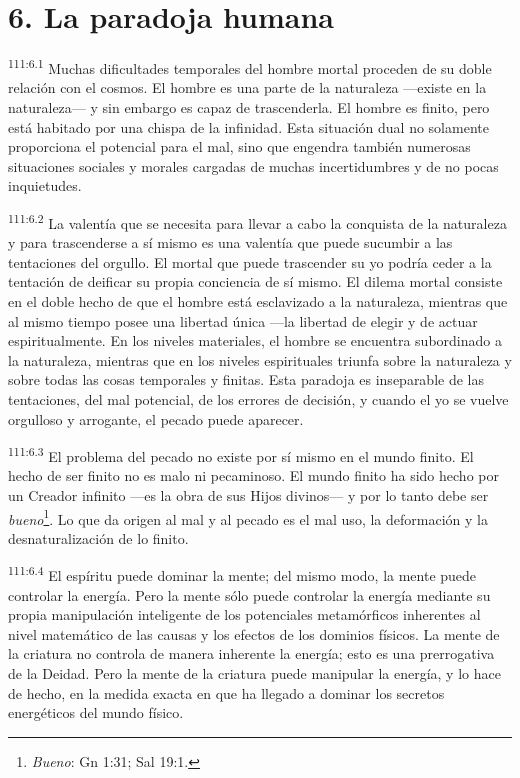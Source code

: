 \section*{6. La paradoja humana}
\par
\textsuperscript{111:6.1} Muchas dificultades temporales del hombre mortal proceden de su doble relación con el cosmos. El hombre es una parte de la naturaleza ---existe en la naturaleza--- y sin embargo es capaz de trascenderla. El hombre es finito, pero está habitado por una chispa de la infinidad. Esta situación dual no solamente proporciona el potencial para el mal, sino que engendra también numerosas situaciones sociales y morales cargadas de muchas incertidumbres y de no pocas inquietudes.

\par
\textsuperscript{111:6.2} La valentía que se necesita para llevar a cabo la conquista de la naturaleza y para trascenderse a sí mismo es una valentía que puede sucumbir a las tentaciones del orgullo. El mortal que puede trascender su yo podría ceder a la tentación de deificar su propia conciencia de sí mismo. El dilema mortal consiste en el doble hecho de que el hombre está esclavizado a la naturaleza, mientras que al mismo tiempo posee una libertad única ---la libertad de elegir y de actuar espiritualmente. En los niveles materiales, el hombre se encuentra subordinado a la naturaleza, mientras que en los niveles espirituales triunfa sobre la naturaleza y sobre todas las cosas temporales y finitas. Esta paradoja es inseparable de las tentaciones, del mal potencial, de los errores de decisión, y cuando el yo se vuelve orgulloso y arrogante, el pecado puede aparecer.

\par
\textsuperscript{111:6.3} El problema del pecado no existe por sí mismo en el mundo finito. El hecho de ser finito no es malo ni pecaminoso. El mundo finito ha sido hecho por un Creador infinito ---es la obra de sus Hijos divinos--- y por lo tanto debe ser \textit{bueno}\footnote{\textit{Bueno}: Gn 1:31; Sal 19:1.}. Lo que da origen al mal y al pecado es el mal uso, la deformación y la desnaturalización de lo finito.

\par
\textsuperscript{111:6.4} El espíritu puede dominar la mente; del mismo modo, la mente puede controlar la energía. Pero la mente sólo puede controlar la energía mediante su propia manipulación inteligente de los potenciales metamórficos inherentes al nivel matemático de las causas y los efectos de los dominios físicos. La mente de la criatura no controla de manera inherente la energía; esto es una prerrogativa de la Deidad. Pero la mente de la criatura puede manipular la energía, y lo hace de hecho, en la medida exacta en que ha llegado a dominar los secretos energéticos del mundo físico.


